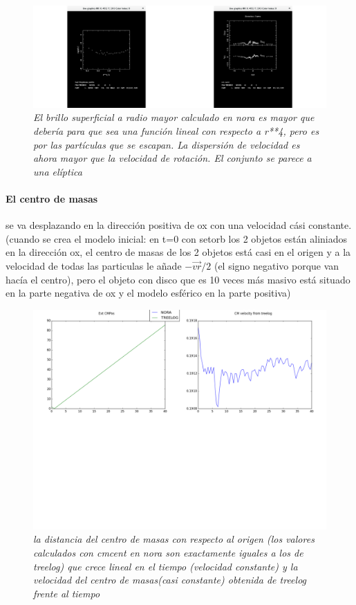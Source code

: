 \documentclass[12pt]{article} %
\renewcommand{\=}[1]{\stackrel{#1}{=}} %
\theoremstyle{definition}
\theoremstyle{remark}
\begin{document}
\begin{figure}[!ht]
 \centering
 \includegraphics[scale=0.3]{norarotsbr2.png}
 \caption{\emph{El brillo superficial a radio mayor calculado en nora es mayor que debería para que sea una función lineal con respecto a r**4, 
pero es por las partículas que se escapan. La dispersión de velocidad es ahora mayor que la velocidad de rotación. El conjunto se parece a una elíptica}}
\end{figure}

\clearpage
\paragraph{El centro de masas} se va desplazando en la dirección positiva de ox con una velocidad cási constante.(cuando se crea el modelo inicial: en t=0 con setorb los 2 objetos están aliniados en la dirección ox, el centro de masas de los 2 objetos está casi en el origen y a la velocidad de todas las particulas le añade $-\vec{vr}/2 $ (el signo negativo porque van hacía el centro), pero el objeto con disco que es 10 veces más masivo  está situado en la parte negativa de ox y el modelo esférico en la parte positiva)


\begin{figure}[!ht]
 \centering
 \includegraphics[scale=0.2]{cmpos-vel.png}
 \caption{\emph{la distancia del centro de masas con respecto al origen 
(los valores calculados con cmcent en nora son exactamente iguales a los de treelog) 
que crece lineal en el tiempo (velocidad constante) y la velocidad del centro de masas(casi constante) obtenida de treelog frente al tiempo }}
\end{figure}
\end{document}
